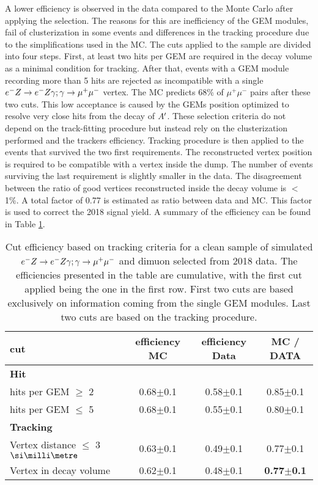 A lower efficiency is observed in the data compared to the Monte Carlo after applying the selection. The reasons for this are inefficiency of the GEM modules, fail of clusterization in some events and differences in the tracking procedure due to the simplifications used in the MC. The cuts applied to the sample are divided into four steps. First, at least two hits per GEM are required in the decay volume as a minimal condition for tracking. After that, events with a GEM module recording more than 5 hits are rejected as incompatible with a single $e^- Z \to e^- Z \gamma; \gamma \to \mu^+ \mu^-$ vertex. The MC predicts 68\% of $\mu^+ \mu^-$ pairs after these two cuts. This low acceptance is caused by the GEMs position optimized to resolve very close hits from the decay of $A'$. These selection criteria do not depend on the track-fitting procedure but instead rely on the clusterization performed and the trackers efficiency. Tracking procedure is then applied to the events that survived the two first requirements. The reconstructed vertex position is required to be compatible with a vertex inside the dump. The number of events surviving the last requirement is slightly smaller in the data. 
The disagreement between the ratio of good vertices reconstructed inside the decay volume is $<$1\%. A total factor of 0.77 is estimated as ratio between data and MC. This factor is used to correct the 2018 signal yield. A summary of the efficiency can be found in Table \ref{tab:dimuon:efficiencies}.

\begin{center}
\begin{table}
  \begin{tabular}{|l|c|c|c|}
    \hline
    cut & efficiency MC & efficiency Data & MC / DATA \\
    \hline
    \multicolumn{4}{|l|}{\textbf{Hit}}\\
    \hline
    hits per GEM $\geq$ 2 & 0.68$\pm$0.1 & 0.58$\pm$0.1 & 0.85$\pm$0.1 \\
    hits per GEM $\leq$ 5 & 0.68$\pm$0.1 & 0.55$\pm$0.1 & 0.80$\pm$0.1 \\
    \hline
    \multicolumn{4}{|l|}{\textbf{Tracking}}\\    
    \hline
    Vertex distance $\leq$ 3 $\mmi$ & 0.63$\pm$0.1 & 0.49$\pm$0.1 & 0.77$\pm$0.1  \\
    Vertex in decay volume & 0.62$\pm$0.1 & 0.48$\pm$0.1 & \textbf{0.77$\pm$0.1}\\
    \hline
    
  \end{tabular}
  \caption[MC/DATA for the tracking procedure and vertex reconstruction]{Cut efficiency based on tracking criteria for a clean sample of simulated $e^- Z \to e^- Z \gamma; \gamma \to \mu^+ \mu^-$ and dimuon selected from 2018 data. The efficiencies presented in the table are cumulative, with the first cut applied being the one in the first row. First two cuts are based exclusively on information coming from the single GEM modules. Last two cuts are based on the tracking procedure.}
  \label{tab:dimuon:efficiencies}
\end{table}
\end{center}

